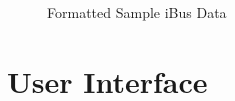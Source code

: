 \begin{figure}[ht!]
	\caption{Formatted Sample iBus Data}
\label{fig:formattedDataSample}
\end{figure}

\FloatBarrier
\section{User Interface}
\begin{figure}[ht!]
	\caption{}
\label{fig:ui1}
\end{figure}

\begin{figure}[ht!]
	\caption{}
\label{fig:ui2}
\end{figure}

